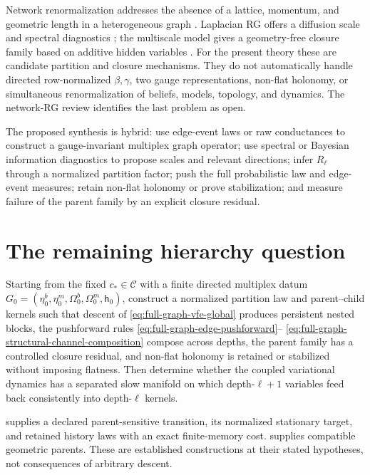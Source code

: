 Network renormalization addresses the absence of a lattice, momentum, and
geometric length in a heterogeneous graph \citep{gabrielli2025network}.
Laplacian RG offers a diffusion scale and spectral diagnostics
\citep{villegas2023laplacian}; the multiscale model gives a geometry-free
closure family based on additive hidden variables
\citep{Garuccio2023Multiscale}. For the present theory these are candidate
partition and closure mechanisms. They do not automatically handle directed
row-normalized $\beta,\gamma$, two gauge representations, non-flat holonomy,
or simultaneous renormalization of beliefs, models, topology, and dynamics.
The network-RG review identifies the last problem as open.

The proposed synthesis is hybrid: use edge-event laws or raw conductances to
construct a gauge-invariant multiplex graph operator; use spectral or
Bayesian information diagnostics to propose scales and relevant directions;
infer $R_\ell$ through a normalized partition factor; push the full
probabilistic law and edge-event measures; retain non-flat holonomy or prove
stabilization; and measure failure of the parent family by an explicit closure
residual. 

\section{The remaining hierarchy question}
\label{sec:full-graph-vfe-target}

Starting from the fixed $c_*\in\mathcal C$ with a finite directed multiplex
datum $G_0=(\eta_0^b,\eta_0^m,\Omega_0^b,\Omega_0^m,\mathsf h_0)$, construct a
normalized partition law and parent--child kernels such that descent of
\eqref{eq:full-graph-vfe-global} produces persistent nested blocks, the
pushforward rules \eqref{eq:full-graph-edge-pushforward}--
\eqref{eq:full-graph-structural-channel-composition} compose across depths,
the parent family has a controlled closure residual, and non-flat holonomy is
retained or stabilized without imposing flatness. Then determine whether the
coupled variational dynamics has a separated slow manifold on which
depth-$\ell+1$ variables feed back consistently into depth-$\ell$ kernels.

 supplies a declared parent-sensitive transition,
its normalized stationary target, and retained history laws with an exact
finite-memory cost.  supplies compatible
geometric parents. These are established constructions at their stated
hypotheses, not consequences of arbitrary descent. 

